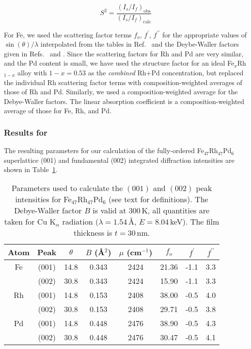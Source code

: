 \documentclass[aps,amsmath,amssymb,prb,superscriptaddress,longtable,preprint,fleqn]{revtex4}
\begin{document}
\begin{equation}
S^2 = \frac{\left(I_s/I_f\right)_{\mathrm{obs}}}{\left(I_s/I_f\right)_{\mathrm{calc}}}
\end{equation}

For Fe, we used the scattering factor terms $f_o$, $f^\prime$, $f^{\prime\prime}$ for the appropriate values of $\sin{(\theta)}/\lambda$ \cite{warren69} interpolated from the tables in Ref.~ and the Deybe-Waller factors given in Refs.~ and . Since the scattering factors for Rh and Pd are very similar,\cite{NIST1,NIST2,warren69} and the Pd content is small, we have used the structure factor for an ideal Fe$_x$Rh$_{1-x}$ alloy with $1\!-\!x\!=\!0.53$ as the {\em combined} Rh+Pd concentration, but replaced the individual Rh scattering factor terms with composition-weighted averages of those of Rh and Pd.\cite{warren69,lott08} Similarly, we used a composition-weighted average for the Debye-Waller factors.\cite{peng96,baria04} The linear absorption coefficient is a composition-weighted average of those for Fe, Rh, and Pd.\cite{NIST1,NIST2} 

\subsubsection{Results for }

The resulting parameters for our calculation of the fully-ordered Fe$_{47}$Rh$_{47}$Pd$_{6}$ superlattice (001) and fundamental (002) integrated diffraction intensities are shown in Table~\ref{tab:parms}.

\begin{table}
\begin{tabular}{@{}ccc c c ccc} \hline
Atom & Peak & $\theta$ & $B$ (\AA$^2$) & $\mu$ (cm$^{-1}$) & $f_o$ & $f^\prime$ & $f^{\prime\prime}$ \\ \hline
Fe & (001) & 14.8 & 0.343 & 2424 & 21.36 & -1.1 & 3.3 \\
& (002) & 30.8 & 0.343 & 2424 &15.90 & -1.1 & 3.3\\ \hline
Rh & (001) & 14.8 &  0.153 & 2408 & 38.00 & -0.5 & 4.0\\
& (002) & 30.8 & 0.153 & 2408 & 29.71 & -0.5 & 3.8\\ \hline
Pd & (001) & 14.8 & 0.448 & 2476 & 38.90 & -0.5 & 4.3\\
& (002) & 30.8 & 0.448 & 2476 & 30.47 & -0.5 & 4.1\\
\end{tabular}
\caption{Parameters used to calculate the $(001)$ and $(002)$ peak intensities for Fe$_{47}$Rh$_{47}$Pd$_{6}$ (see text for definitions). The Debye-Waller factor $B$ is valid at $300\,$K, all quantities are taken for Cu K$_{\alpha}$ radiation ($\lambda\!=\!1.54\,$\AA, $E\!=\!8.04\,$keV). The film thickness is $t\!=\!30\,$nm. }\label{tab:parms}
\end{table}
\end{document}
